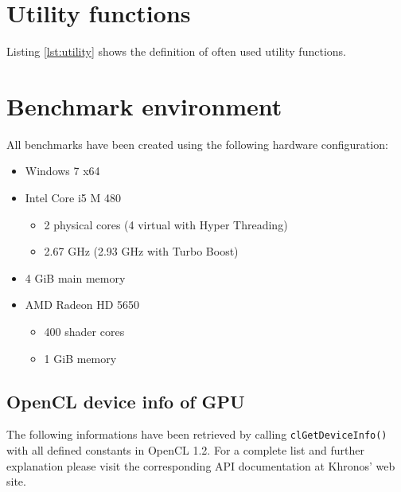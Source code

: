 
\section{Utility functions}
\label{sec:utility_functions}

Listing \ref{lst:utility} shows the definition of often used utility functions.



\section{Benchmark environment}
\label{sec:becnhmark_env}


All benchmarks have been created using the following hardware configuration:

\begin{itemize}
	\item Windows 7 x64
	\item Intel Core i5 M 480
	\begin{itemize}
		\item 2 physical cores (4 virtual with Hyper Threading)
		\item 2.67 GHz (2.93 GHz with Turbo Boost)
	\end{itemize}
	\item 4 GiB main memory
	\item AMD Radeon HD 5650
	\begin{itemize}
		\item 400 shader cores
		\item 1 GiB memory
	\end{itemize}
\end{itemize}

\subsection*{OpenCL device info of GPU}

The following informations have been retrieved by calling \lstinline!clGetDeviceInfo()! with all defined constants in OpenCL 1.2. For a complete list and further explanation please visit the corresponding API documentation at Khronos' web site.

